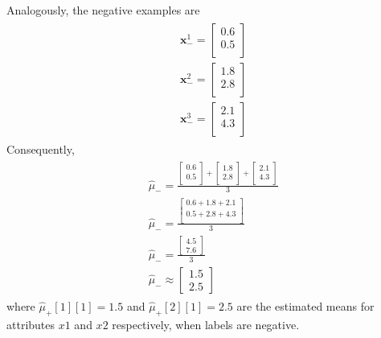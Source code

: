 \documentclass[leqno]{article}
\begin{document}
\noindent Analogously, the negative examples are
\begin{gather*}
\begin{split}
&\textbf{x}_-^1 = 
 \begin{bmatrix}
   0.6 \\
   0.5 \\
 \end{bmatrix}\\
&\textbf{x}_-^2 = 
 \begin{bmatrix}
   1.8 \\
   2.8 \\
\end{bmatrix}\\
&\textbf{x}_-^3 = 
 \begin{bmatrix}
   2.1 \\
   4.3\\
 \end{bmatrix}
\end{split}
\end{gather*}
Consequently,
\begin{gather*}
\begin{split}
&\hat{\mu}_- = 
 \frac{ \begin{bmatrix}
   0.6 \\
   0.5\\ 
 \end{bmatrix} +  \begin{bmatrix}
   1.8 \\
   2.8\\ 
 \end{bmatrix} +  \begin{bmatrix}
   2.1\\
   4.3\\
 \end{bmatrix}}{3}\\
&\hat{\mu}_- = 
 \frac{\begin{bmatrix}
   0.6 + 1.8 + 2.1\\
   0.5 + 2.8 + 4.3\\ 
   \end{bmatrix}}{3}\\
&\hat{\mu}_- = 
 \frac{\begin{bmatrix}
   4.5\\
   7.6 
   \end{bmatrix}}{3}\\
&\hat{\mu}_- \approx 
\begin{bmatrix}
   1.5\\
   2.5 
   \end{bmatrix}
\end{split}
\end{gather*}
where $\hat{\mu}_+[1][1] = 1.5$ and $\hat{\mu}_+[2][1] = 2.5$ are the estimated means for attributes $x1$ and $x2$ respectively, when labels are negative.
\end{document}
